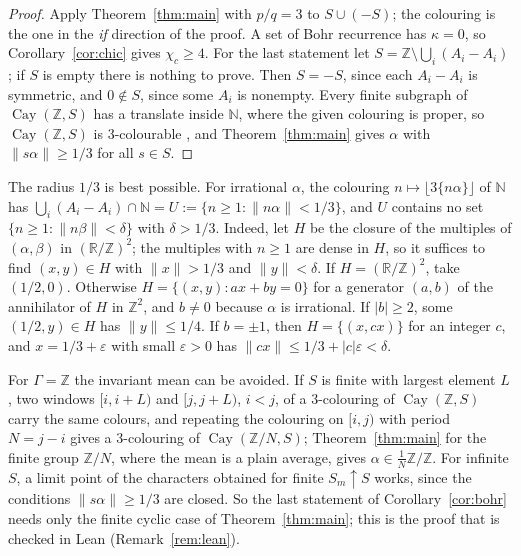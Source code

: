 \documentclass[11pt,a4paper]{amsart}
\theoremstyle{definition}
\newcommand{\R}{\mathbb{R}}
\newcommand{\Z}{\mathbb{Z}}
\newcommand{\Cay}{\operatorname{Cay}}
\newcommand{\RZ}{\R/\Z}
\begin{document}
\begin{proof}
Apply Theorem~\ref{thm:main} with $p/q=3$ to $S\cup(-S)$; the colouring is the one in the \emph{if} direction of
the proof. A set of Bohr recurrence has $\kappa=0$, so Corollary~\ref{cor:chic} gives $\chi_c\ge4$. For the last statement let $S=\Z\setminus\bigcup_i(A_i-A_i)$; if $S$ is empty there is nothing to prove. Then
$S=-S$, since each $A_i-A_i$ is symmetric, and $0\notin S$, since some $A_i$ is nonempty. Every finite subgraph of $\Cay(\Z,S)$ has a
translate inside $\mathbb N$, where the given colouring is proper, so $\Cay(\Z,S)$ is $3$-colourable \cite{dBE}, and
Theorem~\ref{thm:main} gives $\alpha$ with $\|s\alpha\|\ge1/3$ for all $s\in S$.
\end{proof}

The radius $1/3$ is best possible. For irrational $\alpha$, the colouring $n\mapsto\lfloor3\{n\alpha\}\rfloor$ of
$\mathbb N$ has $\bigcup_i(A_i-A_i)\cap\mathbb N=U:=\{n\ge1:\|n\alpha\|<1/3\}$, and $U$ contains no set
$\{n\ge1:\|n\beta\|<\delta\}$ with $\delta>1/3$. Indeed, let $H$ be the closure of the multiples of $(\alpha,\beta)$
in $(\RZ)^2$; the multiples with $n\ge1$ are dense in $H$, so it suffices to find $(x,y)\in H$ with $\|x\|>1/3$ and
$\|y\|<\delta$. If $H=(\RZ)^2$, take $(1/2,0)$. Otherwise $H=\{(x,y):ax+by=0\}$ for a generator $(a,b)$ of the
annihilator of $H$ in $\Z^2$, and $b\ne0$ because $\alpha$ is irrational. If $|b|\ge2$, some $(1/2,y)\in H$ has
$\|y\|\le1/4$. If $b=\pm1$, then $H=\{(x,cx)\}$ for an integer $c$, and $x=1/3+\varepsilon$ with small
$\varepsilon>0$ has $\|cx\|\le1/3+|c|\varepsilon<\delta$.

For $\Gamma=\Z$ the invariant mean can be avoided. If $S$ is
finite with largest element $L$, two windows $[i,i+L)$ and $[j,j+L)$, $i<j$, of a $3$-colouring of $\Cay(\Z,S)$ carry
the same colours, and repeating the colouring on $[i,j)$ with period $N=j-i$ gives a $3$-colouring of
$\Cay(\Z/N,S)$; Theorem~\ref{thm:main} for the finite group $\Z/N$, where the mean is a plain average, gives
$\alpha\in\frac1N\Z/\Z$. For infinite $S$, a limit point of the characters obtained for finite $S_m\uparrow S$ works,
since the conditions $\|s\alpha\|\ge1/3$ are closed. So the last statement of Corollary~\ref{cor:bohr} needs only
the finite cyclic case of Theorem~\ref{thm:main}; this is the proof that is checked in Lean (Remark~\ref{rem:lean}).
\end{document}
